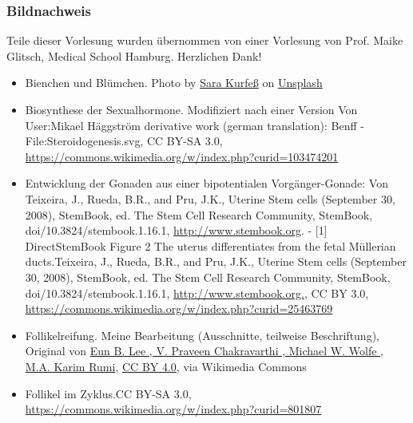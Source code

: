 \documentclass{beamer}
\begin{document}
\begin{frame}
\frametitle{Bildnachweis}

\begin{tiny}

Teile dieser Vorlesung wurden übernommen von einer Vorlesung von Prof. Maike Glitsch, Medical School Hamburg. Herzlichen Dank!


 
\begin{itemize}

   

\item
Bienchen und Blümchen. Photo by \href{https://unsplash.com/@stereophototyp?utm_source=unsplash&utm_medium=referral&utm_content=creditCopyText}{Sara Kurfeß} on \href{https://unsplash.com/s/photos/flowers-and-bees?utm_source=unsplash&utm_medium=referral&utm_content=creditCopyText}{Unsplash}

\item
Biosynthese der Sexualhormone. Modifiziert nach einer Version Von User:Mikael Häggström derivative work (german translation): Benff - File:Steroidogenesis.svg, CC BY-SA 3.0, \url{https://commons.wikimedia.org/w/index.php?curid=103474201}


\item

Entwicklung der Gonaden aus einer bipotentialen Vorgänger-Gonade: Von Teixeira, J., Rueda, B.R., and Pru, J.K., Uterine Stem cells (September 30, 2008), StemBook, ed. The Stem Cell Research Community, StemBook, doi/10.3824/stembook.1.16.1, \url{http://www.stembook.org}. - [1] DirectStemBook Figure 2 The uterus differentiates from the fetal Müllerian ducts.Teixeira, J., Rueda, B.R., and Pru, J.K., Uterine Stem cells (September 30, 2008), StemBook, ed. The Stem Cell Research Community, StemBook, doi/10.3824/stembook.1.16.1, \url{http://www.stembook.org.}, CC BY 3.0, \url{https://commons.wikimedia.org/w/index.php?curid=25463769}

\item 
Follikelreifung. Meine Bearbeitung (Ausschnitte, teilweise Beschriftung), Original von \href{https://commons.wikimedia.org/wiki/File:Foliculo_desarrollo_Gonadotrop.jpg}{Eun B. Lee , V. Praveen Chakravarthi , Michael W. Wolfe , M.A. Karim Rumi}, \href{https://creativecommons.org/licenses/by/4.0}{CC BY 4.0}, via Wikimedia Commons


\item
Follikel im Zyklus.CC BY-SA 3.0, \url{https://commons.wikimedia.org/w/index.php?curid=801807}



\end{itemize}
\end{tiny}
\end{frame}
\end{document}
